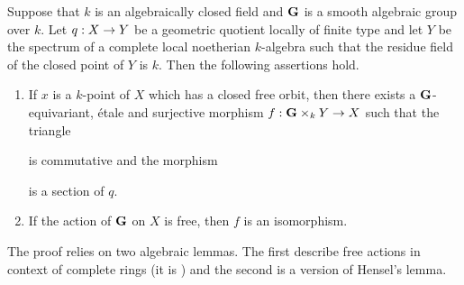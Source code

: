 \begin{theorem}\label{theorem:free_actions_over_complete_local_rings_are_trivial_bundles}
Suppose that $k$ is an algebraically closed field and $\mathbf{G}$ is a smooth algebraic group over $k$. Let $q:X\rightarrow Y$ be a geometric quotient locally of finite type and let $Y$ be the spectrum of a complete local noetherian $k$-algebra such that the residue field of the closed point of $Y$ is $k$. Then the following assertions hold.
\begin{enumerate}[label=\emph{\textbf{(\arabic*)}}, leftmargin=3.0em]
\item If $x$ is a $k$-point of $X$ which has a closed free orbit, then there exists a $\mathbf{G}$-equivariant, {\'e}tale and surjective morphism $f:\mathbf{G}\times_k Y \rightarrow X$ such that the triangle
\begin{center}
\end{center}
is commutative and the morphism
\begin{center}
\end{center}
is a section of $q$.
\item If the action of $\mathbf{G}$ on $X$ is free, then $f$ is an isomorphism.
\end{enumerate}
\end{theorem}
\noindent
The proof relies on two algebraic lemmas. The first describe free actions in context of complete rings (it is {\cite[lemma on page 18]{mumford1994geometric}}) and the second is a version of Hensel's lemma.

